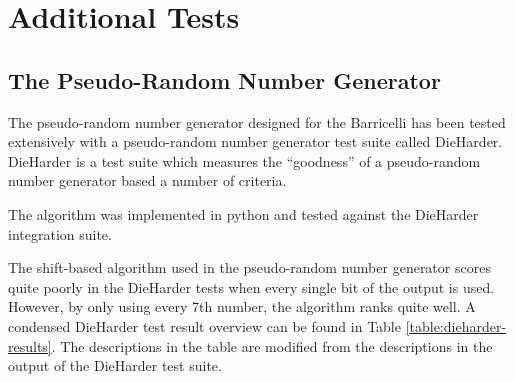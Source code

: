 \section{Additional Tests}

\subsection{The Pseudo-Random Number Generator}


The pseudo-random number generator designed for the Barricelli has been tested extensively with a pseudo-random number generator test suite called DieHarder\cite{dieharder}.
DieHarder is a test suite which measures the ``goodness'' of a pseudo-random number generator based a number of criteria.

The algorithm was implemented in python and tested against the DieHarder integration suite.

The shift-based algorithm used in the pseudo-random number generator scores quite poorly in the DieHarder tests when every single bit of the output is used.
However, by only using every 7th number, the algorithm ranks quite well.
A condensed DieHarder test result overview can be found in Table \vref{table:dieharder-results}.
The descriptions in the table are modified from the descriptions in the output of the DieHarder test suite.

